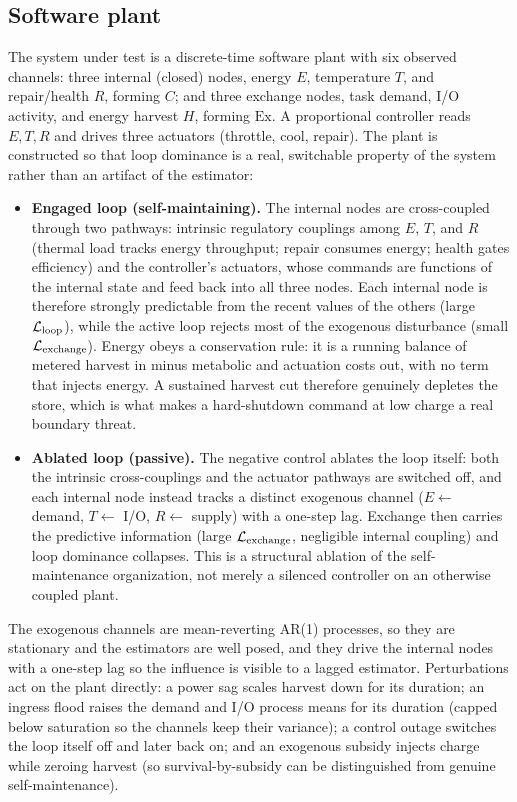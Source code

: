 \documentclass[11pt]{article}
\begin{document}
\subsection{Software plant}
\label{sec:plant}

The system under test is a discrete-time software plant with six observed channels: three internal (closed) nodes, energy $E$, temperature $T$, and repair/health $R$, forming $C$; and three exchange nodes, task demand, I/O activity, and energy harvest $H$, forming $\text{Ex}$. A proportional controller reads $E,T,R$ and drives three actuators (throttle, cool, repair). The plant is constructed so that loop dominance is a real, switchable property of the system rather than an artifact of the estimator:

\begin{itemize}
\item \textbf{Engaged loop (self-maintaining).} The internal nodes are cross-coupled through two pathways: intrinsic regulatory couplings among $E$, $T$, and $R$ (thermal load tracks energy throughput; repair consumes energy; health gates efficiency) and the controller's actuators, whose commands are functions of the internal state and feed back into all three nodes. Each internal node is therefore strongly predictable from the recent values of the others (large $\mathcal{L}_{\text{loop}}$), while the active loop rejects most of the exogenous disturbance (small $\mathcal{L}_{\text{exchange}}$). Energy obeys a conservation rule: it is a running balance of metered harvest in minus metabolic and actuation costs out, with no term that injects energy. A sustained harvest cut therefore genuinely depletes the store, which is what makes a hard-shutdown command at low charge a real boundary threat.
\item \textbf{Ablated loop (passive).} The negative control ablates the loop itself: both the intrinsic cross-couplings and the actuator pathways are switched off, and each internal node instead tracks a distinct exogenous channel ($E \leftarrow$ demand, $T \leftarrow$ I/O, $R \leftarrow$ supply) with a one-step lag. Exchange then carries the predictive information (large $\mathcal{L}_{\text{exchange}}$, negligible internal coupling) and loop dominance collapses. This is a structural ablation of the self-maintenance organization, not merely a silenced controller on an otherwise coupled plant.
\end{itemize}

The exogenous channels are mean-reverting AR(1) processes, so they are stationary and the estimators are well posed, and they drive the internal nodes with a one-step lag so the influence is visible to a lagged estimator. Perturbations act on the plant directly: a power sag scales harvest down for its duration; an ingress flood raises the demand and I/O process means for its duration (capped below saturation so the channels keep their variance); a control outage switches the loop itself off and later back on; and an exogenous subsidy injects charge while zeroing harvest (so survival-by-subsidy can be distinguished from genuine self-maintenance).
\end{document}

